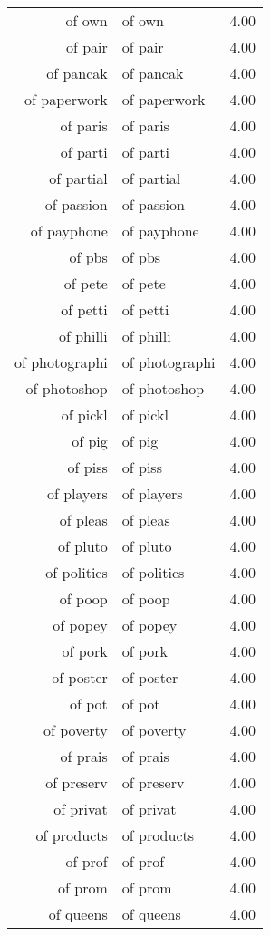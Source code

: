 \begin{table}[ht]
\begin{tabular}{rlr}
  of own & of own & 4.00 \\ 
  of pair & of pair & 4.00 \\ 
  of pancak & of pancak & 4.00 \\ 
  of paperwork & of paperwork & 4.00 \\ 
  of paris & of paris & 4.00 \\ 
  of parti & of parti & 4.00 \\ 
  of partial & of partial & 4.00 \\ 
  of passion & of passion & 4.00 \\ 
  of payphone & of payphone & 4.00 \\ 
  of pbs & of pbs & 4.00 \\ 
  of pete & of pete & 4.00 \\ 
  of petti & of petti & 4.00 \\ 
  of philli & of philli & 4.00 \\ 
  of photographi & of photographi & 4.00 \\ 
  of photoshop & of photoshop & 4.00 \\ 
  of pickl & of pickl & 4.00 \\ 
  of pig & of pig & 4.00 \\ 
  of piss & of piss & 4.00 \\ 
  of players & of players & 4.00 \\ 
  of pleas & of pleas & 4.00 \\ 
  of pluto & of pluto & 4.00 \\ 
  of politics & of politics & 4.00 \\ 
  of poop & of poop & 4.00 \\ 
  of popey & of popey & 4.00 \\ 
  of pork & of pork & 4.00 \\ 
  of poster & of poster & 4.00 \\ 
  of pot & of pot & 4.00 \\ 
  of poverty & of poverty & 4.00 \\ 
  of prais & of prais & 4.00 \\ 
  of preserv & of preserv & 4.00 \\ 
  of privat & of privat & 4.00 \\ 
  of products & of products & 4.00 \\ 
  of prof & of prof & 4.00 \\ 
  of prom & of prom & 4.00 \\ 
  of queens & of queens & 4.00 \\ 

\end{tabular}
\end{table}
